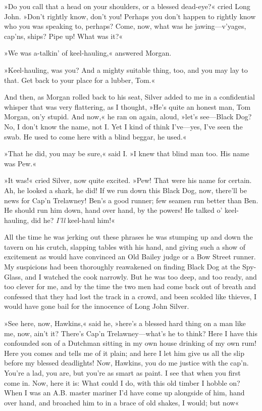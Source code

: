 »Do you call that a head on your shoulders, or a blessed dead-eye?« cried Long John. »Don't rightly know, don't you! Perhaps you don't happen to rightly know who you was speaking to, perhaps? Come, now, what was he jawing—v'yages, cap'ns, ships? Pipe up! What was it?«

»We was a-talkin' of keel-hauling,« answered Morgan.

»Keel-hauling, was you? And a mighty suitable thing, too, and you may lay to that. Get back to your place for a lubber, Tom.«

And then, as Morgan rolled back to his seat, Silver added to me in a confidential whisper that was very flattering, as I thought, »He's quite an honest man, Tom Morgan, on'y stupid. And now,« he ran on again, aloud, »let's see—Black Dog? No, I don't know the name, not I. Yet I kind of think I've—yes, I've seen the swab. He used to come here with a blind beggar, he used.«

»That he did, you may be sure,« said I. »I knew that blind man too. His name was Pew.«

»It was!« cried Silver, now quite excited. »Pew! That were his name for certain. Ah, he looked a shark, he did! If we run down this Black Dog, now, there'll be news for Cap'n Trelawney! Ben's a good runner; few seamen run better than Ben. He should run him down, hand over hand, by the powers! He talked o' keel-hauling, did he? \textit{I'll} keel-haul him!«

All the time he was jerking out these phrases he was stumping up and down the tavern on his crutch, slapping tables with his hand, and giving such a show of excitement as would have convinced an Old Bailey judge or a Bow Street runner. My suspicions had been thoroughly reawakened on finding Black Dog at the Spy-Glass, and I watched the cook narrowly. But he was too deep, and too ready, and too clever for me, and by the time the two men had come back out of breath and confessed that they had lost the track in a crowd, and been scolded like thieves, I would have gone bail for the innocence of Long John Silver.

»See here, now, Hawkins,« said he, »here's a blessed hard thing on a man like me, now, ain't it? There's Cap'n Trelawney—what's he to think? Here I have this confounded son of a Dutchman sitting in my own house drinking of my own rum! Here you comes and tells me of it plain; and here I let him give us all the slip before my blessed deadlights! Now, Hawkins, you do me justice with the cap'n. You're a lad, you are, but you're as smart as paint. I see that when you first come in. Now, here it is: What could I do, with this old timber I hobble on? When I was an A.B. master mariner I'd have come up alongside of him, hand over hand, and broached him to in a brace of old shakes, I would; but now\longdash«

